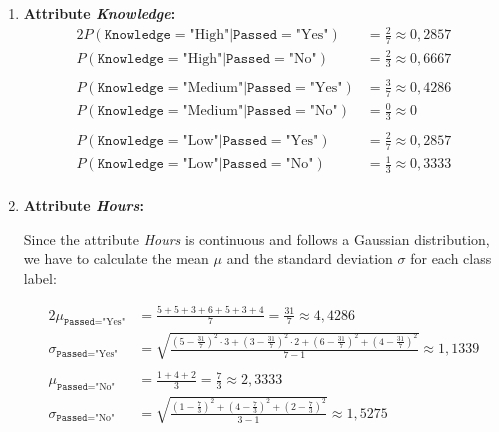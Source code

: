 \documentclass[
english,
smallborders
]{i6prcsht}
\newcommand{\Likelihood}[4]{P(\texttt{#1}=\text{"#2"} | \texttt{#3}=\text{"#4"})}
\begin{document}
\begin{solution}
\begin{enumerate}
\begin{enumerate}
			      \item \textbf{Attribute \textit{Knowledge}:}
			            \begin{alignat*}{2}
				            \Likelihood{Knowledge}{High}{Passed}{Yes}   & = \frac{2}{7} \approx 0,2857 \\
				            \Likelihood{Knowledge}{High}{Passed}{No}    & = \frac{2}{3} \approx 0,6667 \\
				                                                        &                              \\
				            \Likelihood{Knowledge}{Medium}{Passed}{Yes} & = \frac{3}{7} \approx 0,4286 \\
				            \Likelihood{Knowledge}{Medium}{Passed}{No}  & = \frac{0}{3} \approx 0      \\
				                                                        &                              \\
				            \Likelihood{Knowledge}{Low}{Passed}{Yes}    & = \frac{2}{7} \approx 0,2857 \\
				            \Likelihood{Knowledge}{Low}{Passed}{No}     & = \frac{1}{3} \approx 0,3333 \\
			            \end{alignat*}

			      \item \textbf{Attribute \textit{Hours}:}

			            Since the attribute \textit{Hours} is continuous and follows a Gaussian distribution, we have to calculate the mean $\mu$ and the standard deviation $\sigma$ for each class label:

			            \begin{alignat*}{2}
				            \mu_{\texttt{Passed}=\text{"Yes"}}    & = \frac{5 + 5 + 3 + 6 + 5 + 3 + 4}{7} = \frac{31}{7} \approx 4,4286                                                                   \\
				            \sigma_{\texttt{Passed}=\text{"Yes"}} & = \sqrt{\frac{(5-\frac{31}{7})^2 \cdot 3 + (3-\frac{31}{7})^2 \cdot 2 + (6-\frac{31}{7})^2 + (4-\frac{31}{7})^2}{7-1}} \approx 1,1339 \\
				                                                  &                                                                                                                                       \\
				            \mu_{\texttt{Passed}=\text{"No"}}     & = \frac{1 + 4 + 2}{3} = \frac{7}{3} \approx 2,3333                                                                                    \\
				            \sigma_{\texttt{Passed}=\text{"No"}}  & = \sqrt{\frac{(1-\frac{7}{3})^2 + (4-\frac{7}{3})^2 + (2-\frac{7}{3})^2}{3-1}} \approx 1,5275                                         \\
			            \end{alignat*}


\end{enumerate}
\end{enumerate}
\end{solution}
\end{document}
